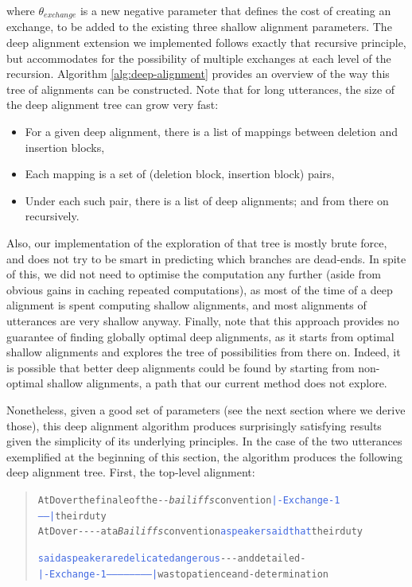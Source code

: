 \documentclass[a4paper,fleqn]{cas-dc}
\begin{document}
where \(\theta_{exchange}\) is a new negative parameter that defines the
cost of creating an exchange, to be added to the existing three shallow
alignment parameters. The deep alignment extension we implemented
follows exactly that recursive principle, but accommodates for the
possibility of multiple exchanges at each level of the recursion.
Algorithm \ref{alg:deep-alignment} provides an overview of the way this
tree of alignments can be constructed. Note that for long utterances,
the size of the deep alignment tree can grow very fast:

\begin{itemize}
\item
  For a given deep alignment, there is a list of mappings between
  deletion and insertion blocks,
\item
  Each mapping is a set of (deletion block, insertion block) pairs,
\item
  Under each such pair, there is a list of deep alignments; and from
  there on recursively.
\end{itemize}



Also, our implementation of the exploration of that tree is mostly brute
force, and does not try to be smart in predicting which branches are
dead-ends. In spite of this, we did not need to optimise the computation
any further (aside from obvious gains in caching repeated computations),
as most of the time of a deep alignment is spent computing shallow
alignments, and most alignments of utterances are very shallow anyway.
Finally, note that this approach provides no guarantee of finding
globally optimal deep alignments, as it starts from optimal shallow
alignments and explores the tree of possibilities from there on. Indeed,
it is possible that better deep alignments could be found by starting
from non-optimal shallow alignments, a path that our current method does
not explore.

Nonetheless, given a good set of parameters (see the next section where
we derive those), this deep alignment algorithm produces surprisingly
satisfying results given the simplicity of its underlying principles. In
the case of the two utterances exemplified at the beginning of this
section, the algorithm produces the following deep alignment tree.
First, the top-level alignment:

\begin{quote}\begin{alltt}\small
At Dover \textcolor{BrickRed}{the finale of the} -  - \emph{\textcolor{Sepia}{bailiffs}} convention \textcolor{RoyalBlue}{|-Exchange-1------|} their duty
At Dover -   -      -  -   \textcolor{OliveGreen}{at a} \emph{\textcolor{Sepia}{Bailiffs}} convention \textcolor{RoyalBlue}{a speaker said that} their duty

\textcolor{RoyalBlue}{said a speaker are delicate dangerous} -   -  -        and \textcolor{BrickRed}{detailed} -
\textcolor{RoyalBlue}{|-Exchange-1------------------------|} \textcolor{OliveGreen}{was to patience} and -        \textcolor{OliveGreen}{determination}
\end{alltt}\end{quote}
\end{document}
